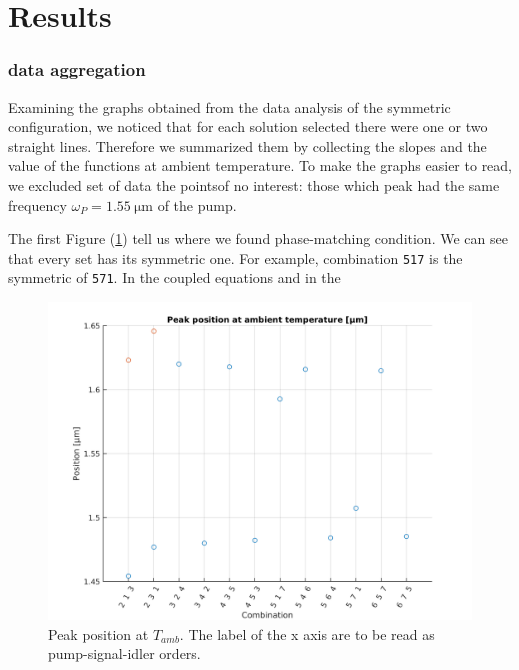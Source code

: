 \documentclass[12pt,a4paper,twoside]{article}
\begin{document}

\section{Results}
\subsubsection{data aggregation}
Examining the graphs obtained from the data analysis of the symmetric configuration, we noticed that for each solution selected there were one or two straight lines.
Therefore we summarized them by collecting the slopes and the value of the functions at ambient temperature.
To make the graphs easier to read, we excluded set of data the pointsof no interest: those which peak had the same frequency $\omega_P = \SI{1.55}{\um}$ of the pump.

The first Figure (\ref{fig_sym_pp@t2}) tell us where we found phase-matching condition.
We can see that every set has its symmetric one.
For example, combination \texttt{517} is the symmetric of \texttt{571}.
In the coupled equations and in the 

\begin{figure}[!h]
	\centering
	\includegraphics[width=.75\textwidth]{ppaat2.png}
	\caption{Peak position at $T_{amb}$. The label of the x axis are to be read as pump-signal-idler orders.}
	\label{fig_sym_pp@t2} 	%
\end{figure}
\end{document}
